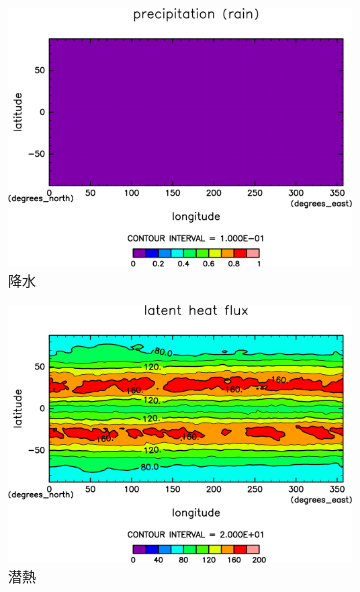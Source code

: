 \documentclass[body]{subfiles}
\begin{document}
\begin{figure}[t]
\begin{subfigure}{.4\textwidth}
		\includegraphics[width=\columnwidth]{S1800/Rain,time=3650:4015-crop-rotate.pdf}
		\caption{降水\hmu*{[W/m^{-2}]}}\label{S1800降水}
	\end{subfigure}
	\begin{subfigure}{.4\textwidth}
		\centering
		\includegraphics[width=\columnwidth]{S1800/Evap,time=3650:4015-crop-rotate.pdf}
		\caption{潜熱\hmu*{[W/m^{-2}]}}\label{S1800潜熱}
	\end{subfigure}
	\begin{subfigure}{.4\textwidth}
		\centering

\end{subfigure}
\end{figure}
\end{document}
